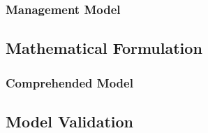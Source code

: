\subsubsection{Management Model}


\subsection{Mathematical Formulation} %
\label{sub:mathematical_formulation}
\subsubsection{Comprehended Model}

\subsection{Model Validation} %
\label{sub:model_validation}



